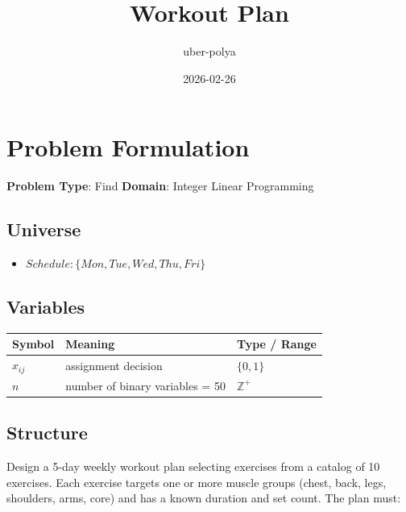 \documentclass[11pt, a4paper]{article}
\title{Workout Plan}
\author{uber-polya}
\date{2026-02-26}
\begin{document}
\maketitle
\tableofcontents
\newpage

\section{Problem Formulation}

\begin{polyamodel}

\textbf{Problem Type}: Find \hfill
\textbf{Domain}: Integer Linear Programming


\end{polyamodel}

\subsection{Universe}

\begin{itemize}
  \item $Schedule: \{Mon, Tue, Wed, Thu, Fri\}$
\end{itemize}

\subsection{Variables}

\begin{longtable}{lll}
\toprule
\textbf{Symbol} & \textbf{Meaning} & \textbf{Type / Range} \\
\midrule
\endhead
$x_{ij}$ & assignment decision & $\{0, 1\}$ \\
$n$ & number of binary variables = 50 & $\mathbb{{Z}}^+$ \\
\bottomrule
\end{longtable}

\subsection{Structure}

Design a 5-day weekly workout plan selecting exercises from a catalog of 10 exercises.
Each exercise targets one or more muscle groups (chest, back, legs, shoulders, arms, core)
and has a known duration and set count.  The plan must:
\end{document}
